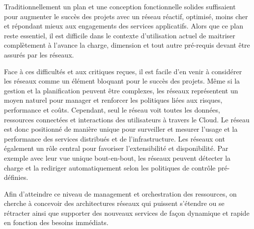 
Traditionnellement un plan et une conception fonctionnelle solides suffisaient pour augmenter le succès des projets avec un réseau réactif, optimisé, moins cher et répondant mieux aux engagements des services applicatifs. Alors que ce plan reste essentiel, il est difficile dans le contexte d'utilisation actuel de maitriser complètement  à l'avance la charge, dimension et tout autre pré-requis devant être assurés par les réseaux.

Face à ces difficultés et aux critiques reçues, il est facile d'en venir à considérer les réseaux comme un élément bloquant pour le succès des projets. Même si la gestion et la planification peuvent être complexes, les réseaux représentent un moyen naturel pour manager et renforcer les politiques liées aux risques, performance et coûts. Cependant, seul le réseau voit toutes les données, ressources connectées et interactions des utilisateurs à travers le Cloud. Le réseau est donc positionné de manière unique pour surveiller et mesurer l'usage et la performance des services distribués et de l'infrastructure. Les réseaux ont également un rôle central pour favoriser l'extensibilité et disponibilité. Par exemple avec leur vue unique bout-en-bout, les réseaux peuvent détecter la charge et la rediriger automatiquement selon les politiques de contrôle pré-définies.

Afin d'atteindre ce niveau de management et orchestration des ressources, on cherche  à concevoir des architectures réseaux qui puissent s'étendre ou se rétracter ainsi que supporter des nouveaux services de façon dynamique et rapide en fonction des besoins immédiats. \cite{ibmPlanningVirtCCchap4} \cite{cloudAutomation} \cite{hpCloudEffectsOnNetworkIntro}


